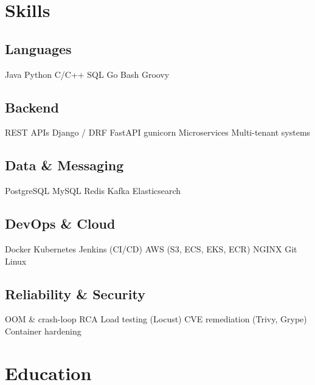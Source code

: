 \documentclass[]{openfont}
\begin{document}
\begin{minipage}[t]{0.33\textwidth}


    \section{Skills}

    \subsection{Languages}
    Java \textbullet{} Python \textbullet{} C/C++ \textbullet{} SQL \textbullet{} Go \textbullet{} Bash \textbullet{} Groovy
    \sectionsep

    \subsection{Backend}
    REST APIs \textbullet{} Django / DRF \textbullet{} FastAPI \textbullet{} gunicorn \textbullet{} Microservices \textbullet{} Multi-tenant systems
    \sectionsep

    \subsection{Data \& Messaging}
    PostgreSQL \textbullet{} MySQL \textbullet{} Redis \textbullet{} Kafka \textbullet{} Elasticsearch
    \sectionsep

    \subsection{DevOps \& Cloud}
    Docker \textbullet{} Kubernetes \textbullet{} Jenkins (CI/CD) \textbullet{} AWS (S3, ECS, EKS, ECR) \textbullet{} NGINX \textbullet{} Git \textbullet{} Linux
    \sectionsep

    \subsection{Reliability \& Security}
    OOM \& crash-loop RCA \textbullet{} Load testing (Locust) \textbullet{} CVE remediation (Trivy, Grype) \textbullet{} Container hardening
    \sectionsep


    \section{Education}


\end{minipage}
\end{document}
